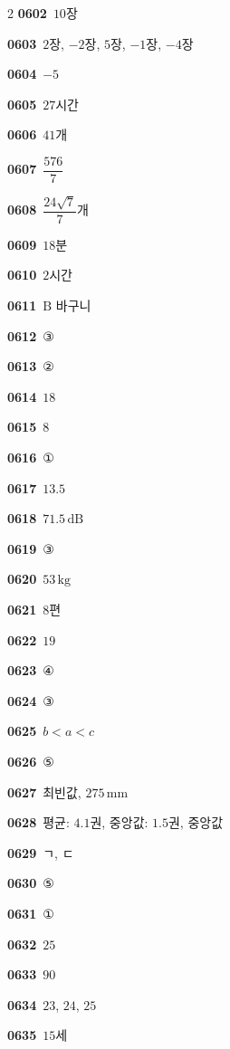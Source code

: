 \documentclass[10pt,a4paper]{article}
\newcommand{\pt}[1]{\mathrm{#1}}
\begin{document}
\begin{multicols}{2}
\noindent\textbf{0602}\ $10$장\par
\noindent\textbf{0603}\ $2$장, $-2$장, $5$장, $-1$장, $-4$장\par
\noindent\textbf{0604}\ $-5$\par
\noindent\textbf{0605}\ $27$시간\par
\noindent\textbf{0606}\ $41$개\par
\noindent\textbf{0607}\ $\dfrac{576}{7}$\par
\noindent\textbf{0608}\ $\dfrac{24\sqrt{7}}{7}$개\par
\noindent\textbf{0609}\ $18$분\par
\noindent\textbf{0610}\ $2$시간\par
\noindent\textbf{0611}\ $\pt{B}$ 바구니\par
\noindent\textbf{0612}\ ③\par
\noindent\textbf{0613}\ ②\par
\noindent\textbf{0614}\ $18$\par
\noindent\textbf{0615}\ $8$\par
\noindent\textbf{0616}\ ①\par
\noindent\textbf{0617}\ $13.5$\par
\noindent\textbf{0618}\ $71.5\,\mathrm{dB}$\par
\noindent\textbf{0619}\ ③\par
\noindent\textbf{0620}\ $53\,\mathrm{kg}$\par
\noindent\textbf{0621}\ $8$편\par
\noindent\textbf{0622}\ $19$\par
\noindent\textbf{0623}\ ④\par
\noindent\textbf{0624}\ ③\par
\noindent\textbf{0625}\ $b<a<c$\par
\noindent\textbf{0626}\ ⑤\par
\noindent\textbf{0627}\ 최빈값, $275\,\mathrm{mm}$\par
\noindent\textbf{0628}\ 평균: $4.1$권, 중앙값: $1.5$권, 중앙값\par
\noindent\textbf{0629}\ ㄱ, ㄷ\par
\noindent\textbf{0630}\ ⑤\par
\noindent\textbf{0631}\ ①\par
\noindent\textbf{0632}\ $25$\par
\noindent\textbf{0633}\ $90$\par
\noindent\textbf{0634}\ $23$, $24$, $25$\par
\noindent\textbf{0635}\ $15$세\par

\end{multicols}
\end{document}

